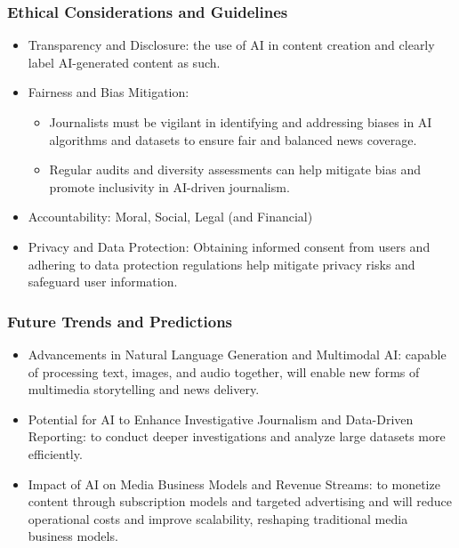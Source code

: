 \begin{frame}[fragile]\frametitle{Ethical Considerations and Guidelines}

\begin{itemize}
\item Transparency and Disclosure: the use of AI in content creation and clearly label AI-generated content as such.
\item Fairness and Bias Mitigation:
    \begin{itemize}
        \item Journalists must be vigilant in identifying and addressing biases in AI algorithms and datasets to ensure fair and balanced news coverage.
        \item Regular audits and diversity assessments can help mitigate bias and promote inclusivity in AI-driven journalism.
    \end{itemize}
\item Accountability: Moral, Social, Legal (and Financial)
\item Privacy and Data Protection: Obtaining informed consent from users and adhering to data protection regulations help mitigate privacy risks and safeguard user information.
\end{itemize}

\end{frame}

\begin{frame}[fragile]\frametitle{Future Trends and Predictions}

\begin{itemize}
\item Advancements in Natural Language Generation and Multimodal AI: capable of processing text, images, and audio together, will enable new forms of multimedia storytelling and news delivery.
\item Potential for AI to Enhance Investigative Journalism and Data-Driven Reporting: to conduct deeper investigations and analyze large datasets more efficiently.
\item Impact of AI on Media Business Models and Revenue Streams: to monetize content through subscription models and targeted advertising and will reduce operational costs and improve scalability, reshaping traditional media business models.
\end{itemize}

\end{frame}


